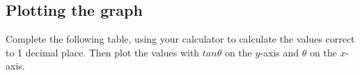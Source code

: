 \subsection*{Plotting the graph}
\nopagebreak
Complete the following table, using your calculator to calculate the values correct to 1 decimal place. Then plot the values with $tan\theta $ on the $y$-axis and $\theta $ on the $x$-axis.\par 
\setlength\mytablespace{16\tabcolsep}
\addtolength\mytablespace{9\arrayrulewidth}
\setlength\mytablewidth{\linewidth}
\setlength\mytableroom{\mytablewidth}
\addtolength\mytableroom{-\mytablespace}
\setlength\myfixedwidth{0pt}
\setlength\mystarwidth{\mytableroom}
\addtolength\mystarwidth{-\myfixedwidth}
\divide{}
